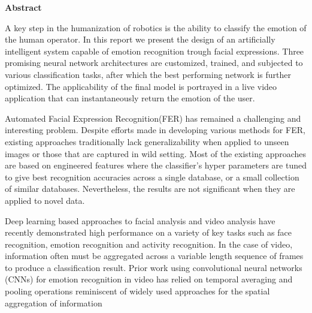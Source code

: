\begin{center}
	\Huge \textbf{Abstract}
\end{center}
A key step in the humanization of robotics is the ability to classify the emotion of the human operator. In this report we present the design of an artificially intelligent system capable of emotion recognition trough facial expressions. Three promising neural network architectures are customized, trained, and subjected to various classification tasks, after which the best performing network is further optimized. The applicability of the final model is portrayed in a live video application that can instantaneously return the emotion of the user.

Automated Facial Expression Recognition(FER) has remained a challenging and interesting problem. Despite efforts made in developing various methods for FER, existing approaches traditionally lack generalizability when applied to unseen images or those that are captured in wild setting. Most of the existing approaches are based on engineered features where the classifier’s hyper parameters are tuned to give best recognition accuracies across a single database, or a small collection of similar databases. Nevertheless, the results are not significant when they are applied to novel data. 

Deep learning based approaches to facial analysis and video analysis have recently demonstrated high performance on a variety of key tasks such as face recognition, emotion recognition and activity recognition. In the case of video, information often must be aggregated across a variable length sequence of frames to produce a classification result. Prior work using convolutional neural networks (CNNs) for emotion recognition in video has relied on temporal averaging and pooling operations reminiscent of widely used approaches for the spatial aggregation of information